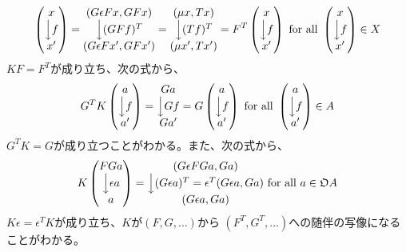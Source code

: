 {\begin{equation*}
\begin{split}
\begin{pmatrix}
			x \\ \Big\downarrow{f} \\ x'
		\end{pmatrix} = \begin{matrix}
			(G\epsilon Fx, GFx) \\ \Big\downarrow{(GFf)^T} \\ (G\epsilon Fx', GFx')
		\end{matrix} = \begin{matrix}
			(\mu x, Tx) \\ \Big\downarrow{(Tf)^T} \\ (\mu x', Tx')
		\end{matrix} = F^T \begin{pmatrix}
			x \\ \Big\downarrow{f} \\ x'
		\end{pmatrix} \text{ for all } \begin{pmatrix}
			x \\ \Big\downarrow{f} \\ x'
		\end{pmatrix} \in X
	\end{split}\end{equation*}
	$KF=F^T$が成り立ち、次の式から、
	\begin{equation*}\begin{split}
		G^TK\begin{pmatrix}
			a \\ \Big\downarrow{f} \\ a'
		\end{pmatrix} = \begin{matrix}
			Ga \\ \Big\downarrow{Gf} \\ Ga'
		\end{matrix} = G\begin{pmatrix}
			a \\ \Big\downarrow{f} \\ a'
		\end{pmatrix} \text{ for all } \begin{pmatrix}
			a \\ \Big\downarrow{f} \\ a'
		\end{pmatrix}\in A
	\end{split}\end{equation*}
	$G^TK=G$が成り立つことがわかる。また、次の式から、
	\begin{equation*}\begin{split}
		K\begin{pmatrix}
			FGa \\ \Big\downarrow{\epsilon a} \\ a
		\end{pmatrix} = \begin{matrix}
			(G\epsilon FGa, Ga) \\ \Big\downarrow{(G\epsilon a)^T 
			= \epsilon^T(G\epsilon a, Ga)} \\ (G\epsilon a, Ga)
		\end{matrix} \text{ for all } a\in{\mathfrak{O}} A
	\end{split}\end{equation*}
	$K\epsilon = \epsilon^TK$が成り立ち、$K$が$(F,G,\dots)$から
	$(F^T,G^T,\dots)$への随伴の写像になることがわかる。

}
